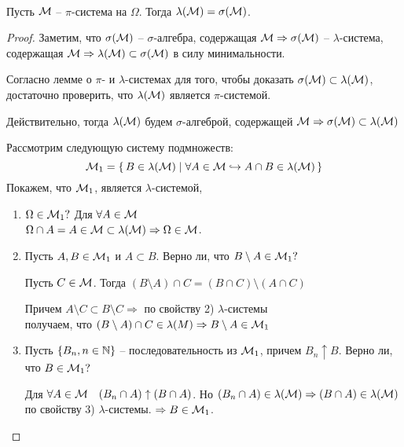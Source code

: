 \begin{theorem}~

	Пусть $\mathcal{M}$ -- $\pi$-система на $\Omega$. Тогда $\lambda(\mathcal{M}) = \sigma(\mathcal{M})$.

\end{theorem}

\begin{proof}
	Заметим, что $\sigma(\mathcal{M})$ -- $\sigma$-алгебра, содержащая $\mathcal{M} \Rightarrow \sigma(\mathcal{M})$ -- 
	$\lambda$-система, содержащая $\mathcal{M} \Rightarrow \lambda(\mathcal{M}) \subset \sigma(\mathcal{M})$ 
	в силу минимальности.
	
	Согласно лемме о $\pi$- и $\lambda$-системах для того, чтобы доказать 
	$\sigma(\mathcal{M}) \subset \lambda(\mathcal{M})$, достаточно проверить, что $\lambda(\mathcal{M})$ 
	является $\pi$-системой.
	
	Действительно, тогда $\lambda(\mathcal{M})$  будем $\sigma$-алгеброй, 
	содержащей $\mathcal{M} \Rightarrow \sigma(\mathcal{M}) \subset \lambda(\mathcal{M})$
	
	Рассмотрим следующую систему подмножеств:
	\begin{equation*}
		\mathcal{M}_1 = \left\{ \,  B \in \lambda(\mathcal{M}) \mid \forall A \in \mathcal{M} \hookrightarrow A \cap B \in \lambda(\mathcal{M}) \, \right\}
	\end{equation*}
	Покажем, что $\mathcal{M}_1$, является $\lambda$-системой,
	
	\begin{enumerate}
		\item 
			$\Omega \in \mathcal{M}_1 ?$ Для $\forall A \in \mathcal{M}$\\
			$\Omega \cap A = A \in \mathcal{M} \subset \lambda(\mathcal{M}) \Rightarrow \Omega \in \mathcal{M}$.
		
		\item 
			Пусть $A, B \in \mathcal{M}_1$ и $A \subset B$. 
			Верно ли, что $B \setminus A \in \mathcal{M}_1 ?$

			Пусть $C \in \mathcal{M}$. Тогда $(B \setminus A) \cap C = (B \cap C) \setminus (A \cap C)$

			Причем $A \setminus C \subset B \setminus C \Rightarrow$ по свойству 2) $\lambda$-системы\\
			получаем, что $(B \setminus A) \cap C \in \lambda(M) \Rightarrow B \setminus A \in \mathcal{M}_1$
			
		\item 
			Пусть $\left\{ B_n, n \in \mathbb{N} \right\}$ -- последовательность из $\mathcal{M}_1$, 
			причем $B_n \uparrow B$. Верно ли, что $B \in \mathcal{M}_1 ?$

			Для $\forall A \in \mathcal{M} \quad (B_n \cap A) \uparrow (B \cap A)$. 
			Но $(B_n \cap A) \in \lambda(\mathcal{M}) \Rightarrow (B \cap A) \in \lambda(\mathcal{M})$ 
			по свойству 3) $\lambda$-системы. $\Rightarrow B \in \mathcal{M}_1$.


\end{enumerate}
\end{proof}
